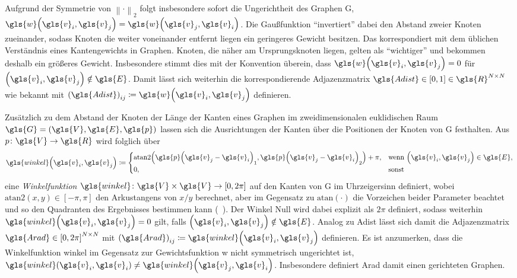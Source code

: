Aufgrund der Symmetrie von ${\left\|\cdot\right\|}_2$ folgt insbesondere sofort die Ungerichtheit des Graphen \gls{G}, \dhe{} $\gls{w}\left(\gls{v}_i, \gls{v}_j\right) = \gls{w}\left(\gls{v}_j, \gls{v}_i\right)$.
Die Gaußfunktion \enquote{invertiert} dabei den Abstand zweier Knoten zueinander, sodass Knoten die weiter voneinander entfernt liegen ein geringeres Gewicht besitzen.
Das korrespondiert mit dem üblichen Verständnis eines Kantengewichts in Graphen.
Knoten, die näher am Ursprungsknoten liegen, gelten als \enquote{wichtiger} und bekommen deshalb ein größeres Gewicht.
Insbesondere stimmt dies mit der Konvention überein, dass $\gls{w}\left(\gls{v}_i, \gls{v}_j\right) = 0$ für $\left(\gls{v}_i, \gls{v}_j\right) \notin \gls{E}$.
Damit lässt sich weiterhin die korrespondierende Adjazenzmatrix $\gls{Adist} \in \left[0, 1\right] \in \gls{R}^{N \times N}$ wie bekannt mit ${\left(\gls{Adist}\right)}_{ij} \coloneqq \gls{w}\left(\gls{v}_i, \gls{v}_j\right)$ definieren.

Zusätzlich zu dem Abstand der Knoten \bzw{} der Länge der Kanten eines Graphen im zweidimensionalen euklidischen Raum $\gls{G} = \left(\gls{V}, \gls{E}, \gls{p}\right)$ lassen sich die Ausrichtungen der Kanten über die Positionen der Knoten von \gls{G} festhalten.
Aus $p \colon \gls{V} \to \gls{R}$ wird folglich über
\begin{equation*}
  \gls{winkel}\left(\gls{v}_i, \gls{v}_j\right) \coloneqq \begin{cases}
    \mathrm{atan2}\left({\gls{p}\left(\gls{v}_j - \gls{v}_i\right)}_1, {\gls{p}\left(\gls{v}_j - \gls{v}_i\right)}_2\right) + \pi, & \text{wenn }\left(\gls{v}_i, \gls{v}_j\right) \in \gls{E},\\
    0, & \text{sonst}
  \end{cases}
\end{equation*}
eine \emph{Winkelfunktion} $\gls{winkel} \colon \gls{V} \times \gls{V} \to \left[0, 2\pi\right]$ auf den Kanten von \gls{G} im Uhrzeigersinn definiert, wobei $\mathrm{atan2}\left(x, y\right) \in \left[-\pi, \pi\right]$ den Arkustangens von $x/y$ berechnet, aber im Gegensatz zu $\mathrm{atan}\left(\cdot\right)$ die Vorzeichen beider Parameter beachtet und so den Quadranten des Ergebnisses bestimmen kann (\vgl{}~\cite{atan2}).
Der Winkel Null wird dabei explizit als $2\pi$ definiert, sodass weiterhin $\gls{winkel}\left(\gls{v}_i, \gls{v}_j\right) = 0$ gilt, falls $\left(\gls{v}_i, \gls{v}_j\right) \notin \gls{E}$.
Analog zu \gls{Adist} lässt sich damit die Adjazenzmatrix $\gls{Arad} \in {\left[0, 2\pi\right]}^{N \times N}$ mit ${\left(\gls{Arad}\right)}_{ij} \coloneqq \gls{winkel}\left(\gls{v}_i, \gls{v}_j\right)$ definieren.
Es ist anzumerken, dass die Winkelfunktion \gls{winkel} im Gegensatz zur Gewichtsfunktion \gls{w} nicht symmetrisch \bzw{} ungerichtet ist, \dhe{} $\gls{winkel}\left(\gls{v}_i, \gls{v}_i\right) \neq \gls{winkel}\left(\gls{v}_j, \gls{v}_i\right)$.
Insbesondere definiert \gls{Arad} damit einen gerichteten Graphen.


